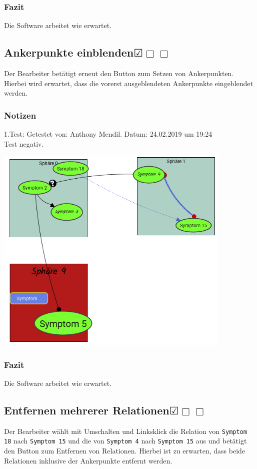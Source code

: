 \documentclass{scrartcl}
\newcommand{\subsectiont}[2]{\subsection[#1]{#1{\normalsize\normalfont #2}}}
\newcommand{\leer}{$\Box$}
\newcommand{\ok}{$\CheckedBox$}
\begin{document}
\subsubsection{Fazit}
Die Software arbeitet wie erwartet.

\subsectiont{Ankerpunkte einblenden}{\dotfill\ok\leer\leer}
Der Bearbeiter betätigt erneut den Button zum Setzen von Ankerpunkten. Hierbei wird erwartet, dass die vorerst ausgeblendeten Ankerpunkte eingeblendet werden. 
\subsubsection{Notizen}
1.Test: Getestet von: Anthony Mendil. Datum: 24.02.2019 um 19:24 \\
Test negativ. 
\begin{center}
\includegraphics[height=10cm]{3_39.PNG}
\end{center}
\subsubsection{Fazit}
Die Software arbeitet wie erwartet.

\subsectiont{Entfernen mehrerer Relationen}{\dotfill\ok\leer\leer}
Der Bearbeiter wählt mit Umschalten und Linksklick die Relation von \texttt{Symptom 18} nach \texttt{Symptom 15} und die von \texttt{Symptom 4} nach \texttt{Symptom 15} aus und betätigt den Button zum Entfernen von Relationen. Hierbei ist zu erwarten, dass beide Relationen inklusive der Ankerpunkte entfernt werden. 
\end{document}
